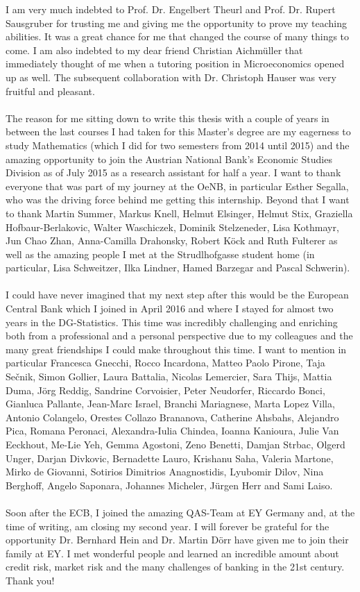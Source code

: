 \newpage
I am very much indebted to Prof. Dr. Engelbert Theurl and Prof. Dr. Rupert Sausgruber for trusting me and giving me the opportunity to prove my teaching abilities. It was a great chance for me that changed the course of many things to come. I am also indebted to my dear friend Christian Aichmüller that immediately thought of me when a tutoring position in Microeconomics opened up as well. The subsequent collaboration with Dr. Christoph Hauser was very fruitful and pleasant.\\
\\
The reason for me sitting down to write this thesis with a couple of years in between the last courses I had taken for this Master's degree are my eagerness to study Mathematics (which I did for two semesters from 2014 until 2015) and the amazing opportunity to join the Austrian National Bank's Economic Studies Division as of July 2015 as a research assistant for half a year. I want to thank everyone that was part of my journey at the OeNB, in particular Esther Segalla, who was the driving force behind me getting this internship. Beyond that I want to thank Martin Summer, Markus Knell, Helmut Elsinger, Helmut Stix, Graziella Hofbaur-Berlakovic, Walter Waschiczek, Dominik Stelzeneder, Lisa Kothmayr, Jun Chao Zhan, Anna-Camilla Drahonsky, Robert Köck and Ruth Fulterer as well as the amazing people I met at the Strudlhofgasse student home (in particular, Lisa Schweitzer, Ilka Lindner, Hamed Barzegar and Pascal Schwerin).  \\
\\
I could have never imagined that my next step after this would be the European Central Bank which I joined in April 2016 and where I stayed for almost two years in the DG-Statistics. This time was incredibly challenging and enriching both from a professional and a personal perspective due to my colleagues and the many great friendships I could make throughout this time. I want to mention in particular Francesca Gnecchi, Rocco Incardona, Matteo Paolo Pirone, Taja Sečnik, Simon Gollier, Laura Battalia, Nicolas Lemercier, Sara Thijs, Mattia Duma, Jörg Reddig, Sandrine Corvoisier, Peter Neudorfer, Riccardo Bonci, Gianluca Pallante, Jean-Marc Israel, Branchi Mariagnese, Marta Lopez Villa, Antonio Colangelo, Orestes Collazo Brananova, Catherine Ahsbahs, Alejandro Pica, Romana Peronaci, Alexandra-Iulia Chindea, Ioanna Kanioura, Julie Van Eeckhout, Me-Lie Yeh, Gemma Agostoni, Zeno Benetti, Damjan Strbac, Olgerd Unger, Darjan Divkovic, Bernadette Lauro, Krishanu Saha, Valeria Martone, Mirko de Giovanni, Sotirios Dimitrios Anagnostidis, Lyubomir Dilov, Nina Berghoff, Angelo Saponara, Johannes Micheler, Jürgen Herr and Sami Laiso.\\
\\
Soon after the ECB, I joined the amazing QAS-Team at EY Germany and, at the time of writing, am closing my second year. I will forever be grateful for the opportunity Dr. Bernhard Hein and Dr. Martin Dörr have given me to join their family at EY. I met wonderful people and learned an incredible amount about credit risk, market risk and the many challenges of banking in the 21st century. Thank you!